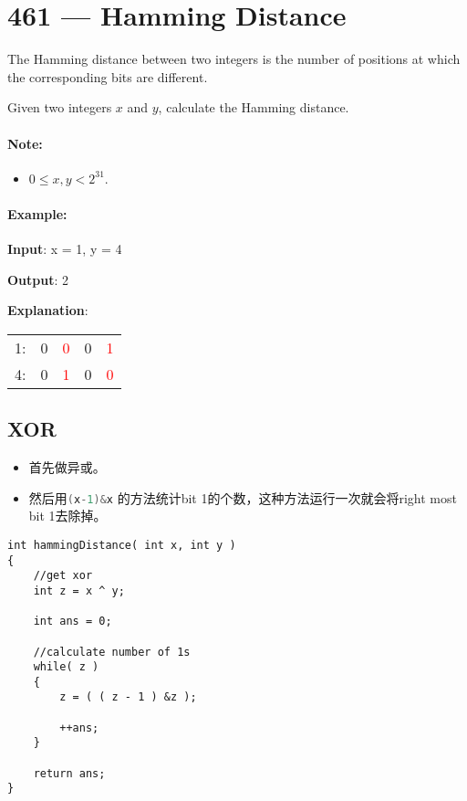 \section{461 --- Hamming Distance}
The Hamming distance between two integers is the number of positions at which the corresponding bits are different.

Given two integers $x$ and $y$, calculate the Hamming distance.

\paragraph{Note:}
\begin{itemize}
\item $0 \leq x, y < 2^{31}$.
\end{itemize}

\paragraph{Example:}

\begin{flushleft}
\textbf{Input}: x = 1, y = 4

\textbf{Output}: 2

\textbf{Explanation}:

\begin{table}[H]
\begin{tabular}{lcccc}
1: & 0 & \textcolor{red}{0} & 0 & \textcolor{red}{1}\\
4: & 0 & \textcolor{red}{1} & 0 & \textcolor{red}{0}
\end{tabular}
\end{table}
\end{flushleft}

\subsection{XOR}

\begin{itemize}
\item 首先做异或。
\item 然后用\lstinline[language=C++, basicstyle=\small\ttfamily, keywordstyle=\bfseries\color{green!40!black}]|(x-1)&x| 的方法统计bit 1的个数，这种方法运行一次就会将right most bit 1去除掉。
\end{itemize}

\setcounter{lstlisting}{0}
\begin{lstlisting}[style=customc, caption={XOR}]
int hammingDistance( int x, int y )
{
    //get xor
    int z = x ^ y;

    int ans = 0;

    //calculate number of 1s
    while( z )
    {
        z = ( ( z - 1 ) &z );

        ++ans;
    }

    return ans;
}
\end{lstlisting}


